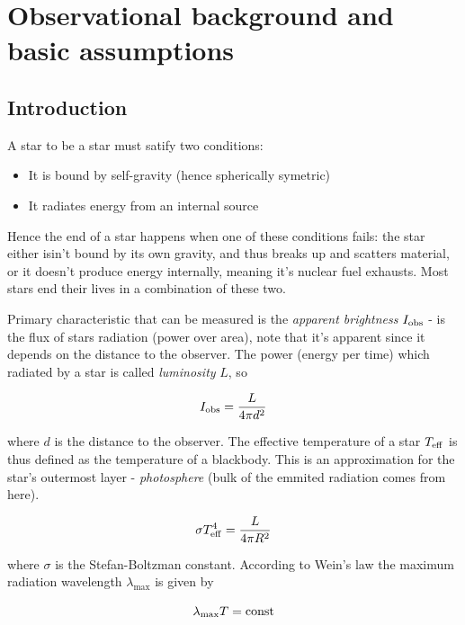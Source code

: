 \section{Observational background and basic assumptions}

\subsection{Introduction}

A star to be a star must satify two conditions:
\begin{itemize}
    \item It is bound by self-gravity (hence spherically symetric)
    \item It radiates energy from an internal source
\end{itemize}

Hence the end of a star happens when one of these conditions fails: the star either isin't bound by its own gravity, and thus breaks up and scatters material, or it doesn't produce energy internally, meaning it's nuclear fuel exhausts. Most stars end their lives in a combination of these two. 

Primary characteristic that can be measured is the \textit{apparent brightness} $I_{\rm obs}$ - is the flux of stars radiation (power over area), note that it's apparent since it depends on the distance to the observer. The power (energy per time) which radiated by a star is called \textit{luminosity} $L$, so

\begin{equation*}
    I_{\rm obs} = \frac{L}{4 \pi d^2} 
\end{equation*}

where $d$ is the distance to the observer. The effective temperature of a star $T_{\rm eff}$ is thus defined as the temperature of a blackbody. This is an approximation for the star's outermost layer - \textit{photosphere} (bulk of the emmited radiation comes from here).

\begin{equation*}
    \sigma T^4_{\rm eff} = \frac{L}{4 \pi R^2}
\end{equation*}

where $\sigma$ is the Stefan-Boltzman constant. According to Wein's law the maximum radiation wavelength $\lambda_{\max}$ is given by

\begin{equation*}
    \lambda_{\rm max} T = {\rm const}
\end{equation*}

